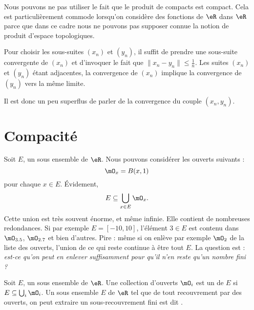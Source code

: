 \begin{remark}
    Nous pouvons ne pas utiliser le fait que le produit de compacts est compact. Cela est particulièrement commode lorsqu'on considère des fonctions de \( \eR\) dans \( \eR\) parce que dans ce cadre nous ne pouvons pas supposer connue la notion de produit d'espace topologiques.

    Pour choisir les sous-suites \( (x_n)\) et \( (y_n)\), il suffit de prendre une sous-suite convergente de \( (x_n)\) et d'invoquer le fait que \( \| x_n-y_n \|\leq \frac{1}{ n }\). Les suites \( (x_n)\) et \( (y_n)\) étant adjacentes, la convergence de \( (x_n)\) implique la convergence de \( (y_n)\) vers la même limite.

    Il est donc un peu superflus de parler de la convergence du couple \( (x_n,y_n)\).
\end{remark}

\section{Compacité}

Soit $E$, un sous ensemble de $\eR$. Nous pouvons considérer les ouverts suivants : 
\begin{equation}
    \mO_x=B(x,1)
\end{equation}
pour chaque $x\in E$. Évidement,
\begin{equation}
    E\subseteq \bigcup_{x\in E}\mO_x.
\end{equation}
Cette union est très souvent énorme, et même infinie. Elle contient de nombreuses redondances. Si par exemple $E=[-10,10]$, l'élément $3\in E$ est contenu dans $\mO_{3.5}$, $\mO_{2.7}$ et bien d'autres. Pire : même si on enlève par exemple $\mO_2$ de la liste des ouverts, l'union de ce qui reste continue à être tout $E$. La question est : \emph{est-ce qu'on peut en enlever suffisamment pour qu'il n'en reste qu'un nombre fini ?}
\begin{definition}
Soit $E$, un sous ensemble de $\eR$. Une collection d'ouverts $\mO_i$ est un  de $E$ si $E\subseteq \bigcup_{i}\mO_i$. Un sous ensemble $E$ de $\eR$ tel que de tout recouvrement par des ouverts, on peut extraire un sous-recouvrement fini est dit .
\end{definition}

